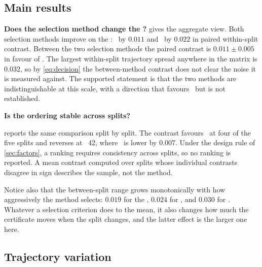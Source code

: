 \subsection{Main results}
\label{sec:main-results}



\textbf{Does the selection method change the \certbound?}
 gives the aggregate view. Both selection methods improve
on the \methodcontrol: \methodmax\ by $0.011$ and \methodrandom\ by $0.022$ in
paired within-split contrast. Between the two selection methods the paired
contrast is $0.011 \pm 0.005$ in favour of \methodrandom. The largest within-split
trajectory spread anywhere in the matrix is $0.032$, so by \cref{eq:decision} the
between-method contrast does not clear the noise it is measured against. The
supported statement is that the two methods are indistinguishable at this scale,
with a direction that favours \methodrandom\ but is not established.

\textbf{Is the ordering stable across splits?}

 reports the same comparison split by split. The contrast
favours \methodrandom\ at four of the five splits and reverses at \splitseed~42,
where \methodmax\ is lower by $0.007$. Under the design rule of
\cref{sec:factors}, a ranking requires consistency across splits, so no ranking
is reported. A mean contrast computed over splits whose individual contrasts
disagree in sign describes the sample, not the method.

Notice also that the between-split range grows monotonically with how aggressively
the method selects: $0.019$ for the \methodcontrol, $0.024$ for \methodmax, and
$0.030$ for \methodrandom. Whatever a selection criterion does to the mean, it
also changes how much the certificate moves when the split changes, and the
latter effect is the larger one here.

\subsection{Trajectory variation}
\label{sec:trajectory}


